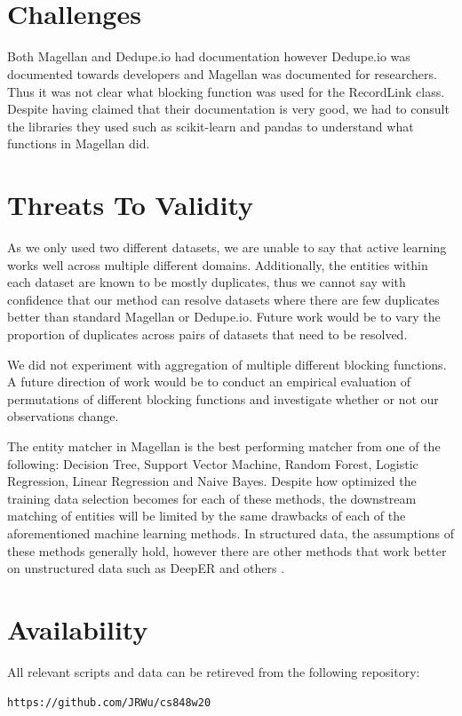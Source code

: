 \documentclass[letterpaper,twocolumn,10pt]{article}
\begin{document}
\noindent{}
\\\\

\section{Challenges}
Both Magellan and Dedupe.io had documentation however Dedupe.io was documented towards developers and Magellan was documented for researchers. Thus it was not clear what blocking function was used for the RecordLink class. Despite having claimed that their documentation is very good, we had to consult the libraries they used such as scikit-learn and pandas to understand what functions in Magellan did. 


\section{Threats To Validity}
As we only used two different datasets, we are unable to say that active learning works well across multiple different domains. Additionally, the entities within each dataset are known to be mostly duplicates, thus we cannot say with confidence that our method can resolve datasets where there are few duplicates better than standard Magellan or Dedupe.io. Future work would be to vary the proportion of duplicates across pairs of datasets that need to be resolved. 

We did not experiment with aggregation of multiple different blocking functions. A future direction of work would be to conduct an empirical evaluation of permutations of different blocking functions and investigate whether or not our observations change. 

The entity matcher in Magellan is the best performing matcher from one of the following: Decision Tree, Support Vector Machine, Random Forest, Logistic Regression, Linear Regression and Naive Bayes. Despite how optimized the training data selection becomes for each of these methods, the downstream matching of entities will be limited by the same drawbacks of each of the aforementioned machine learning methods. In structured data, the assumptions of these methods generally hold, however there are other methods that work better on unstructured data such as DeepER and others \cite{ebraheem2017deeper, mudgal2018deep}.

\section{Availability}\label{Availability}
All relevant scripts and data can be retireved from the following repository:
\begin{center}
{\tt https://github.com/JRWu/cs848w20}
\end{center}



{\footnotesize 

\theendnotes

\newpage
}
\end{document}
